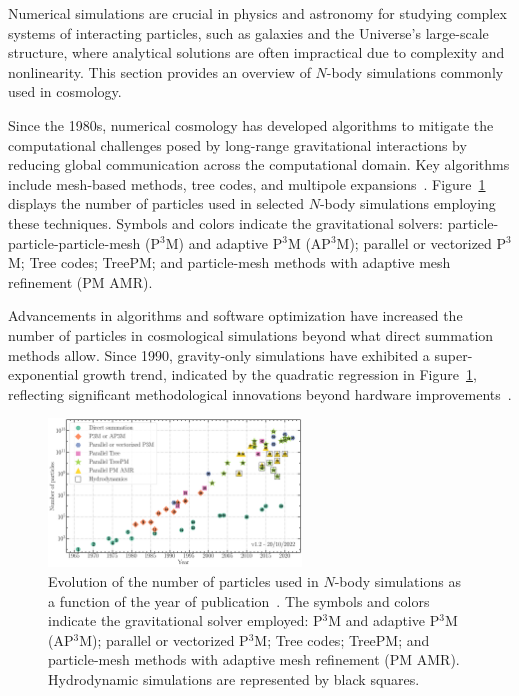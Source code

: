 Numerical simulations are crucial in physics and astronomy for studying complex systems of interacting particles, such as galaxies and the Universe's large-scale structure, where analytical solutions are often impractical due to complexity and nonlinearity. This section provides an overview of $N$-body simulations commonly used in cosmology.

Since the 1980s, numerical cosmology has developed algorithms to mitigate the computational challenges posed by long-range gravitational interactions by reducing global communication across the computational domain. Key algorithms include mesh-based methods, tree codes, and multipole expansions~\citep{1981csup.book.....H}. Figure~\ref{fig:particle-count} displays the number of particles used in selected $N$-body simulations employing these techniques. Symbols and colors indicate the gravitational solvers: particle-particle-particle-mesh (P$^3$M) and adaptive P$^3$M (AP$^3$M); parallel or vectorized P$^3$M; Tree codes; TreePM; and particle-mesh methods with adaptive mesh refinement (PM AMR).

Advancements in algorithms and software optimization have increased the number of particles in cosmological simulations beyond what direct summation methods allow. Since 1990, gravity-only simulations have exhibited a super-exponential growth trend, indicated by the quadratic regression in Figure~\ref{fig:particle-count}, reflecting significant methodological innovations beyond hardware improvements~\citep{leclercq2020}.

\begin{figure} \centering \includegraphics[width=0.6\textwidth]{figures/Moore_law_cosmosims.png} \caption{Evolution of the number of particles used in $N$-body simulations as a function of the year of publication~\citep{leclercq2020}. The symbols and colors indicate the gravitational solver employed: P$^3$M and adaptive P$^3$M (AP$^3$M); parallel or vectorized P$^3$M; Tree codes; TreePM; and particle-mesh methods with adaptive mesh refinement (PM AMR). Hydrodynamic simulations are represented by black squares.} \label{fig:particle-count} \end{figure}

